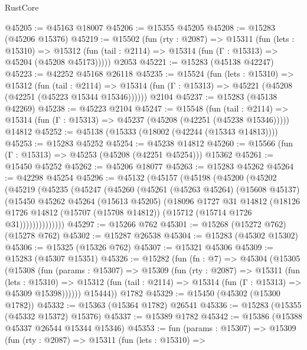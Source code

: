 \begin{lexlean}{RustCore}
\begin{coremodule}
@45205 := @45163 @18007
@45206 := @15355 @45205
@45208 := @15283 (@45206 @15376)
@45219 := @15502
    (fun (rty : @2087) =>
    @15311
      (fun (lets : @15310) =>
      @15312 (fun (tail : @2114) => @15314 (fun (Γ : @15313) => @45204 (@45208 @45173)))))
    @2053
@45221 := @15283 (@45138 @42247)
@45223 := @42252 @45168 @26118
@45235 := @15524
    (fun (lets : @15310) =>
    @15312
      (fun (tail : @2114) =>
      @15314 (fun (Γ : @15313) => @45221 (@45208 (@42251 (@45223 @15344 @15346))))))
    @2104
@45237 := @15283 (@45138 @42269)
@45238 := @45223 @2104
@45247 := @15548
    (fun (tail : @2114) => @15314 (fun (Γ : @15313) => @45237 (@45208 (@42251 (@45238 @15346)))))
    @14812
@45252 := @45138 (@15333 (@18002 (@42244 (@15343 @14813))))
@45253 := @15283 @45252
@45254 := @45238 @14812
@45260 := @15566 (fun (Γ : @15313) => @45253 (@45208 (@42251 @45254))) @15362
@45261 := @15450 @45252
@45262 := @45206 @18077
@45263 := @15283 @45262
@45264 := @42298 @45254
@45296 := @45132
    (@45157
      (@45198
        (@45200
          (@45202
            (@45219
              (@45235
                (@45247
                  (@45260
                    (@45261
                      (@45263 @45264)
                      (@15608 @45137)
                      (@15450
                        @45262
                        @45264
                        (@15613 @45205)
                        (@18096
                          @1727
                          @31
                          @14812
                          (@18126
                            @1726
                            @14812
                            (@15707 (@15708 @14812))
                            (@15712 (@15714 @1726 @31))))))))))))))
@45297 := @15266 @762
@45301 := @15268 (@15272 @762) (@15278 @762)
@45302 := @15287 @26538
@45304 := @15283 (@45302 @15302)
@45306 := @15325 (@15326 @762)
@45307 := @15321 @45306
@45309 := @15283 (@45307 @15351)
@45326 := @15282
    (fun (fn : @7) =>
    @45304
      (@15305
        (@15308
          (fun (params : @15307) =>
          @15309
            (fun (rty : @2087) =>
            @15311
              (fun (lets : @15310) =>
              @15312 (fun (tail : @2114) => @15314 (fun (Γ : @15313) => @45309 @15398))))))
        @15444))
    @1782
@45329 := @15450 (@45302 (@15300 @1782))
@45332 := @15363 (@15364 @1782) @26541
@45336 := @15283 (@15355 (@45332 @15372) @15376)
@45337 := @15389 @1782
@45342 := @15386 (@15388 @45337 @26544 @15344 @15346)
@45353 := fun (params : @15307) =>
  @15309
    (fun (rty : @2087) =>
    @15311
      (fun (lets : @15310) =>

\end{coremodule}
\end{lexlean}
